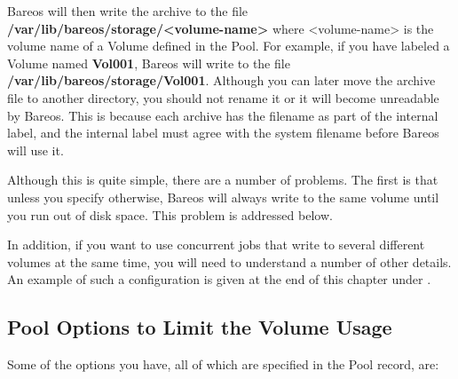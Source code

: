 Bareos will then write the archive to the file {\bf
/var/lib/bareos/storage/{\textless}volume-name{\textgreater}}
where {\textless}volume-name{\textgreater} is the
volume name of a Volume defined in the Pool. For example, if you have labeled
a Volume named {\bf Vol001}, Bareos will write to the file {\bf
/var/lib/bareos/storage/Vol001}. Although you can later move the archive file to
another directory, you should not rename it or it will become unreadable by
Bareos. This is because each archive has the filename as part of the internal
label, and the internal label must agree with the system filename before
Bareos will use it.

Although this is quite simple, there are a number of problems. The first is
that unless you specify otherwise, Bareos will always write to the same volume
until you run out of disk space. This problem is addressed below.

In addition, if you want to use concurrent jobs that write to several
different volumes at the same time, you will need to understand a number
of other details. An example of such a configuration is given
at the end of this chapter under .

\subsection{Pool Options to Limit the Volume Usage}

Some of the options you have, all of which are specified in the Pool record,
are:

